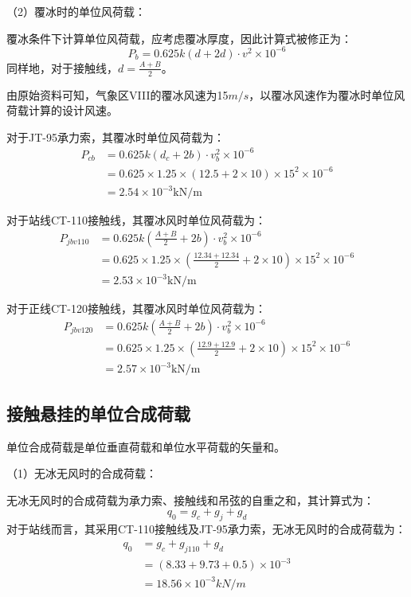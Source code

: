 （2）覆冰时的单位风荷载：

覆冰条件下计算单位风荷载，应考虑覆冰厚度，因此计算式被修正为：
\[
P_b=0.625k(d+2d)\cdot v^2\times 10^{-6}
\]
同样地，对于接触线，$d=\frac{A+B}{2}$。

由原始资料可知，气象区VIII的覆冰风速为15$m/s$，以覆冰风速作为覆冰时单位风荷载计算的设计风速。

对于JT-95承力索，其覆冰时单位风荷载为：
\begin{align*}
	P_{cb} &= 0.625k\left( d_c+2b \right) \cdot v_{b}^{2}\times 10^{-6} \\
	&= 0.625\times 1.25\times \left( 12.5+2\times 10 \right) \times 15^2\times 10^{-6} \\
	&= 2.54\times 10^{-3} \text{kN/m}
\end{align*}

对于站线CT-110接触线，其覆冰风时单位风荷载为：
\begin{align*}
	P_{jbv110} &= 0.625k\left( \frac{A+B}{2}+2b \right) \cdot v_{b}^{2}\times 10^{-6} \\
	&= 0.625\times 1.25\times \left( \frac{12.34+12.34}{2}+2\times 10 \right) \times 15^2\times 10^{-6} \\
	&= 2.53\times 10^{-3} \text{kN/m}
\end{align*}

对于正线CT-120接触线，其覆冰风时单位风荷载为：
\begin{align*}
	P_{jbv120} &= 0.625k\left( \frac{A+B}{2}+2b \right) \cdot v_{b}^{2}\times 10^{-6} \\
	&= 0.625\times 1.25\times \left( \frac{12.9+12.9}{2}+2\times 10 \right) \times 15^2\times 10^{-6} \\
	&= 2.57\times 10^{-3} \text{kN/m}
\end{align*}

\subsection{接触悬挂的单位合成荷载}
单位合成荷载是单位垂直荷载和单位水平荷载的矢量和。

（1）无冰无风时的合成荷载：

无冰无风时的合成荷载为承力索、接触线和吊弦的自重之和，其计算式为：
$$
q_0=g_c+g_j+g_d
$$
对于站线而言，其采用CT-110接触线及JT-95承力索，无冰无风时的合成荷载为：
\begin{align*}
	q_0&=g_c+g_{j110}+g_d
	\\
	&=\left( 8.33+9.73+0.5 \right) \times 10^{-3}
	\\
	&=18.56\times 10^{-3}kN/m
\end{align*}

